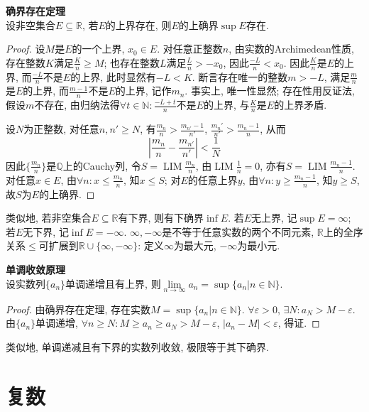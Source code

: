 \begin{thm}\textbf{确界存在定理}\\
设非空集合$E\subseteq \mathbb{R}$, 若$E$的上界存在, 则$E$的上确界$\sup E$存在. 
\end{thm}
\begin{proof}
设$M$是$E$的一个上界, $x_0\in E$. 对任意正整数$n$, 由实数的Archimedean性质, 存在整数$K$满足$\frac{K}{n}\ge M$; 也存在整数$L$满足$\frac{L}{n}> -x_0$, 因此$\frac{-L}{n}<x_0$. 因此$\frac{K}{n}$是$E$的上界, 而$\frac{-L}{n}$不是$E$的上界, 此时显然有$-L<K$. 断言存在唯一的整数$m>-L$, 满足$\frac{m}{n}$是$E$的上界, 而$\frac{m-1}{n}$不是$E$的上界, 记作$m_n$. 事实上, 唯一性显然; 存在性用反证法, 假设$m$不存在, 由归纳法得$\forall t\in \mathbb{N}: \frac{-L+t}{n}$不是$E$的上界, 与$\frac{K}{n}$是$E$的上界矛盾. 
\par 设$N$为正整数, 对任意$n,n'\ge N$, 有$\frac{m_n}{n}>\frac{m_{n'}-1}{n'}$, $\frac{m_n'}{n'}>\frac{m_n-1}{n}$, 从而
\begin{equation}
    \left|\frac{m_n}{n}-\frac{m_{n'}}{n'}\right|<\frac{1}{N}
\end{equation}
因此$\{\frac{m_n}{n}\}$是$\mathbb{Q}$上的Cauchy列, 令$S=\operatorname{LIM} \frac{m_n}{n}$, 由$\operatorname{LIM} \frac{1}{n}=0$, 亦有$S=\operatorname{LIM} \frac{m_n-1}{n}$. 对任意$x\in E$, 由$\forall n: x\le \frac{m_n}{n}$, 知$x\le S$; 对$E$的任意上界$y$, 由$\forall n: y\ge \frac{m_n-1}{n}$, 知$y\ge S$, 故$S$为$E$的上确界. 
\end{proof}
类似地, 若非空集合$E\subseteq \mathbb{R}$有下界, 则有下确界$\inf E$. 若$E$无上界, 记$\sup E = \infty$; 若$E$无下界, 记$\inf E = -\infty$. $\infty,-\infty$是不等于任意实数的两个不同元素, $\mathbb{R}$上的全序关系$\le$可扩展到$\mathbb{R}\cup\{\infty, -\infty\}$: 定义$\infty$为最大元, $-\infty$为最小元. 

\begin{thm}\textbf{单调收敛原理}\\
设实数列$\{a_n\}$单调递增且有上界, 则$\lim\limits_{n\to \infty} a_n = \sup \{a_n\vert n\in \mathbb{N}\}$. 
\end{thm}
\begin{proof}
由确界存在定理, 存在实数$M=\sup \{a_n\vert n\in \mathbb{N}\}$. $\forall \varepsilon>0$, $\exists N: a_N > M-\varepsilon$. 由$\{a_n\}$单调递增, $\forall n\ge N: M \ge a_n\ge a_N > M-\varepsilon$, $|a_n-M|< \varepsilon$, 得证. 
\end{proof}
类似地, 单调递减且有下界的实数列收敛, 极限等于其下确界. 

\section{复数}

